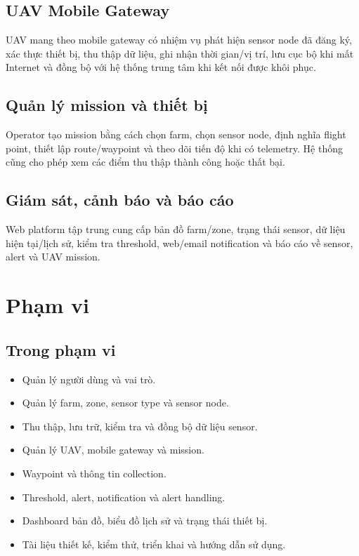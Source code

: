 \subsection{UAV Mobile Gateway}
UAV mang theo mobile gateway có nhiệm vụ phát hiện sensor node đã đăng ký, xác thực thiết bị, thu thập dữ liệu, ghi nhận thời gian/vị trí, lưu cục bộ khi mất Internet và đồng bộ với hệ thống trung tâm khi kết nối được khôi phục.

\subsection{Quản lý mission và thiết bị}
Operator tạo mission bằng cách chọn farm, chọn sensor node, định nghĩa flight point, thiết lập route/waypoint và theo dõi tiến độ khi có telemetry. Hệ thống cũng cho phép xem các điểm thu thập thành công hoặc thất bại.

\subsection{Giám sát, cảnh báo và báo cáo}
Web platform tập trung cung cấp bản đồ farm/zone, trạng thái sensor, dữ liệu hiện tại/lịch sử, kiểm tra threshold, web/email notification và báo cáo về sensor, alert và UAV mission.

\section{Phạm vi}
\subsection{Trong phạm vi}
\begin{itemize}
  \item Quản lý người dùng và vai trò.
  \item Quản lý farm, zone, sensor type và sensor node.
  \item Thu thập, lưu trữ, kiểm tra và đồng bộ dữ liệu sensor.
  \item Quản lý UAV, mobile gateway và mission.
  \item Waypoint và thông tin collection.
  \item Threshold, alert, notification và alert handling.
  \item Dashboard bản đồ, biểu đồ lịch sử và trạng thái thiết bị.
  \item Tài liệu thiết kế, kiểm thử, triển khai và hướng dẫn sử dụng.
\end{itemize}

